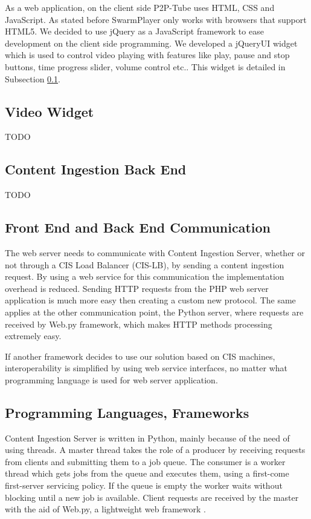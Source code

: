 As a web application, on the client side P2P-Tube uses HTML, CSS and JavaScript. As stated before SwarmPlayer only works with browsers that support HTML5. We decided to use jQuery \cite{jquery} as a JavaScript framework to ease development on the client side programming. We developed a jQueryUI \cite{jqueryui} widget which is used to control video playing with features like play, pause and stop buttons, time progress slider, volume control etc.. This widget is detailed in Subsection \ref{subsec:video-widget}.

\subsection{Video Widget}
\label{subsec:video-widget}

TODO

\subsection{Content Ingestion Back End}
\label{subsec:back-end}

TODO

\subsection{Front End and Back End Communication}
\label{subsec:communication}

The web server needs to communicate with Content Ingestion Server, whether or not through a CIS Load Balancer (CIS-LB), by sending a content ingestion request. By using a web service for this communication the implementation overhead is reduced. Sending HTTP requests from the PHP web server application is much more easy then creating a custom new protocol. The same applies at the other communication point, the Python server, where requests are received by Web.py framework, which makes HTTP methods processing extremely easy.

If another framework decides to use our solution based on CIS machines, interoperability is simplified by using web service interfaces, no matter what programming language is used for web server application.

\subsection{Programming Languages, Frameworks}
\label{subsec:langs-and-frameworks}

Content Ingestion Server is written in Python, mainly because of the need of using threads. A master thread takes the role of a producer by receiving requests from clients and submitting them to a job queue. The consumer is a worker thread which gets jobs from the queue and executes them, using a first-come first-server servicing policy. If the queue is empty the worker waits without blocking until a new job is available. Client requests are received by the master with the aid of Web.py, a lightweight web framework \cite{webpy}.

